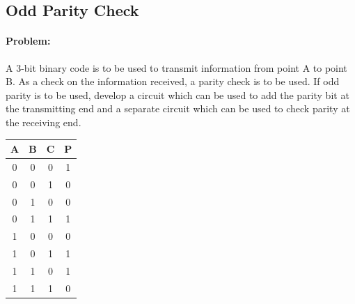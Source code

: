 \documentclass[12pt, a4paper]{report}
\newcommand{\implicantsol}[3][0]{
	\draw[rounded corners=3pt, fill=#3, opacity=0.3] ($(#2.north west)+(135:#1)$) rectangle ($(#2.south east)+(-45:#1)$);
}
\newcommand{\implicant}[4][0]{
	\draw[rounded corners=3pt, fill=#4, opacity=0.3] ($(#2.north west)+(135:#1)$) rectangle ($(#3.south east)+(-45:#1)$);
}
\newenvironment{4kmap}[2]%
{
	\begin{tikzpicture}[baseline=(current bounding box.north),scale=0.8]
		\draw (0,0) grid (4,4);
		\draw (0,4) -- node [pos=0.7,above right,anchor=south west] {\tiny{#1}} node [pos=0.7,below left,anchor=north east] {\tiny{#2}} ++(135:1);
		\matrix (mapa) [matrix of nodes,
		column sep={0.8cm,between origins},
		row sep={0.8cm,between origins},
		every node/.style={minimum size=0.3mm},
		anchor=8.center,
		ampersand replacement=\&] at (0.5,0.5)
		{
			\& |(c00)| 00         \& |(c01)| 01         \& |(c11)| 11         \& |(c10)| 10         \& |(cf)| \phantom{00} \\
			|(r00)| 00             \& |(0)|  \phantom{0} \& |(1)|  \phantom{0} \& |(3)|  \phantom{0} \& |(2)|  \phantom{0} \&                     \\
			|(r01)| 01             \& |(4)|  \phantom{0} \& |(5)|  \phantom{0} \& |(7)|  \phantom{0} \& |(6)|  \phantom{0} \&                     \\
			|(r11)| 11             \& |(12)| \phantom{0} \& |(13)| \phantom{0} \& |(15)| \phantom{0} \& |(14)| \phantom{0} \&                     \\
			|(r10)| 10             \& |(8)|  \phantom{0} \& |(9)|  \phantom{0} \& |(11)| \phantom{0} \& |(10)| \phantom{0} \&                     \\
			|(rf) | \phantom{00}   \&                    \&                    \&                    \&                    \&                     \\
		};
	}%
	{
	\end{tikzpicture}
}
\newcommand{\contingut}[1]{%
	\foreach \x [count=\xi from 0]  in {#1}
	\path (\xi) node {\x};
}
\begin{document}
\subsection{Odd Parity Check}
\paragraph*{Problem: } A 3-bit binary code is to be used to transmit information from point A to point B. As a check on the information received, a parity check is to be used. If odd parity is to be used, develop a circuit which can be used to add the parity bit  at the transmitting end and a separate circuit which can be used to check parity at the receiving end.
\begin{center}
\begin{tabular}{c|c|c||c}
	A & B & C & P \\ \hline
	0 & 0 & 0 & 1 \\ \hline
	0 & 0 & 1 & 0 \\ \hline
	0 & 1 & 0 & 0 \\ \hline
	0 & 1 & 1 & 1 \\ \hline
	1 & 0 & 0 & 0 \\ \hline
	1 & 0 & 1 & 1 \\ \hline
	1 & 1 & 0 & 1 \\ \hline
	1 & 1 & 1 & 0
\end{tabular}
\end{center}
\end{document}
